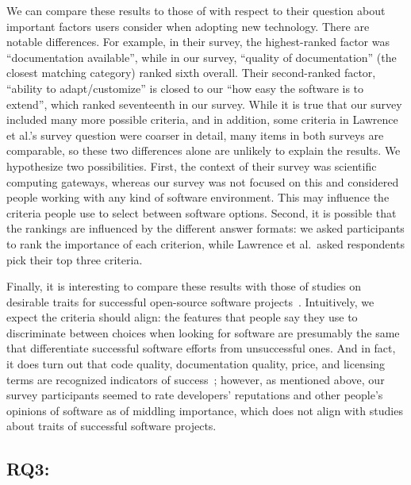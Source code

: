 \documentclass[review]{elsarticle}
\begin{document}
We can compare these results to those of \citet{lawrence2015science} with respect to their question about important factors users consider when adopting new technology.  There are notable differences.  For example, in their survey, the highest-ranked factor was ``documentation available'', while in our survey, ``quality of documentation'' (the closest matching category) ranked sixth overall.  Their second-ranked factor, ``ability to adapt/customize'' is closed to our ``how easy the software is to extend'', which ranked seventeenth in our survey.  While it is true that our survey included many more possible criteria, and in addition, some criteria in Lawrence et al.'s survey question were coarser in detail, many items in both surveys are comparable, so these two differences alone are unlikely to explain the results.  We hypothesize two possibilities.  First, the context of their survey was scientific computing gateways, whereas our survey was not focused on this and considered people working with any kind of software environment.  This may influence the criteria people use to select between software options.  Second, it is possible that the rankings are influenced by the different answer formats: we asked participants to rank the importance of each criterion, while Lawrence et al.\ asked respondents pick their top three criteria.

Finally, it is interesting to compare these results with those of studies on desirable traits for successful open-source software projects~\citep[e.g.,][]{subramaniam2009determinants, lee2009measuring, crowston2003defining, crowston2006information, sen2012open, lee2009measuring}.  Intuitively, we expect the criteria should align: the features that people say they use to discriminate between choices when looking for software are presumably the same that differentiate successful software efforts from unsuccessful ones.  And in fact, it does turn out that code quality, documentation quality, price, and licensing terms are recognized indicators of success~\citep{subramaniam2009determinants, lee2009measuring, crowston2003defining, crowston2006information}; however, as mentioned above, our survey participants seemed to rate developers' reputations and other people's opinions of software as of middling importance, which does not align with studies about traits of successful software projects.


\subsection{RQ3: \rqthreetext}
\label{discussion-rqthree}
\end{document}
